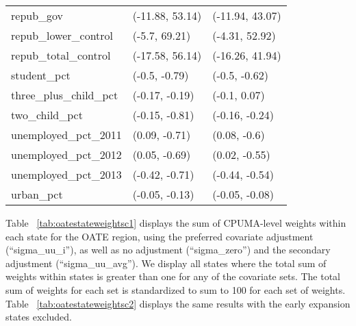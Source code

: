 \begin{table}[ht]
\begin{tabular}{lll}
  repub\_gov & (-11.88, 53.14) & (-11.94, 43.07) \\ 
  repub\_lower\_control & (-5.7, 69.21) & (-4.31, 52.92) \\ 
  repub\_total\_control & (-17.58, 56.14) & (-16.26, 41.94) \\ 
  student\_pct & (-0.5, -0.79) & (-0.5, -0.62) \\ 
  three\_plus\_child\_pct & (-0.17, -0.19) & (-0.1, 0.07) \\ 
  two\_child\_pct & (-0.15, -0.81) & (-0.16, -0.24) \\ 
  unemployed\_pct\_2011 & (0.09, -0.71) & (0.08, -0.6) \\ 
  unemployed\_pct\_2012 & (0.05, -0.69) & (0.02, -0.55) \\ 
  unemployed\_pct\_2013 & (-0.42, -0.71) & (-0.44, -0.54) \\ 
  urban\_pct & (-0.05, -0.13) & (-0.05, -0.08) \\ 
   \hline
\end{tabular}
\end{table}

Table ~\ref{tab:oatestateweightsc1} displays the sum of CPUMA-level weights within each state for the OATE region, using the preferred covariate adjustment (``sigma\_uu\_i''), as well as no adjustment (``sigma\_zero'') and the secondary adjustment (``sigma\_uu\_avg''). We display all states where the total sum of weights within states is greater than one for any of the covariate sets. The total sum of weights for each set is standardized to sum to 100 for each set of weights. Table ~\ref{tab:oatestateweightsc2} displays the same results with the early expansion states excluded.

